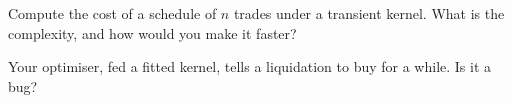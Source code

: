 \begin{interviewq}\label{iq:mx:transient-impact-and-propagator-models:5}
Compute the cost of a schedule of $n$ trades under a transient kernel. What is the complexity, and how would you make it faster?
\end{interviewq}

\begin{interviewq}\label{iq:mx:transient-impact-and-propagator-models:6}
Your optimiser, fed a fitted kernel, tells a liquidation to buy for a while. Is it a bug?
\end{interviewq}
